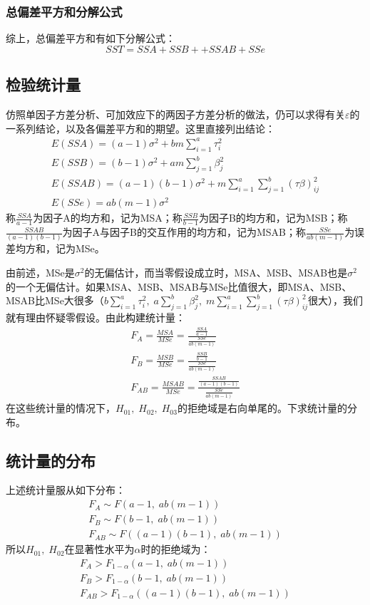 \subsubsection{总偏差平方和分解公式}
综上，总偏差平方和有如下分解公式：
\begin{equation*}
	SST=SSA+SSB++SSAB+SSe
\end{equation*}

\subsection{检验统计量}
仿照单因子方差分析、可加效应下的两因子方差分析的做法，仍可以求得有关$\varepsilon$的一系列结论，以及各偏差平方和的期望。这里直接列出结论：
\begin{gather*}
	E(SSA)=(a-1)\sigma^2+bm\sum_{i=1}^a\tau_i^2 \\
	E(SSB)=(b-1)\sigma^2+am\sum_{j=1}^b\beta_j^2 \\
	E(SSAB)=(a-1)(b-1)\sigma^2+m\sum_{i=1}^a\sum_{j=1}^b(\tau\beta)_{ij}^2 \\
	E(SSe)=ab(m-1)\sigma^2
\end{gather*}
称$\frac{SSA}{a-1}$为因子A的均方和，记为MSA；称$\frac{SSB}{b-1}$为因子B的均方和，记为MSB；称$\frac{SSAB}{(a-1)(b-1)}$为因子A与因子B的交互作用的均方和，记为MSAB；称$\frac{SSe}{ab(m-1)}$为误差均方和，记为MSe。\par
由前述，MSe是$\sigma^2$的无偏估计，而当零假设成立时，MSA、MSB、MSAB也是$\sigma^2$的一个无偏估计。如果MSA、MSB、MSAB与MSe比值很大，即MSA、MSB、MSAB比MSe大很多（$b\sum\limits_{i=1}^a\tau_i^2,\;a\sum\limits_{j=1}^b\beta_j^2,\;m\sum\limits_{i=1}^a\sum\limits_{j=1}^b(\tau\beta)_{ij}^2$很大），我们就有理由怀疑零假设。由此构建统计量：
\begin{gather*}
	F_A=\frac{MSA}{MSe}=\frac{\frac{SSA}{a-1}}{\frac{SSe}{ab(m-1)}} \\
	F_B=\frac{MSB}{MSe}=\frac{\frac{SSB}{b-1}}{\frac{SSe}{ab(m-1)}} \\
	F_{AB}=\frac{MSAB}{MSe}=\frac{\frac{SSAB}{(a-1)(b-1)}}{\frac{SSe}{ab(m-1)}}
\end{gather*}
在这些统计量的情况下，$H_{01},\;H_{02},\;H_{03}$的拒绝域是右向单尾的。下求统计量的分布。

\subsection{统计量的分布}
上述统计量服从如下分布：
\begin{gather*}
	F_A\sim F(a-1,\;ab(m-1)) \\
	F_B\sim F(b-1,\;ab(m-1)) \\
	F_{AB}\sim F((a-1)(b-1),\;ab(m-1))
\end{gather*}
所以$H_{01},\;H_{02}$在显著性水平为$\alpha$时的拒绝域为：
\begin{gather*}
	F_A>F_{1-\alpha}(a-1,\;ab(m-1)) \\
	F_B>F_{1-\alpha}(b-1,\;ab(m-1)) \\
	F_{AB}>F_{1-\alpha}((a-1)(b-1),\;ab(m-1))
\end{gather*}


